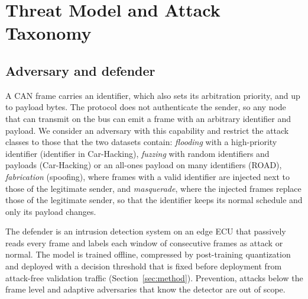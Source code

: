 \section{Threat Model and Attack Taxonomy}\label{sec:threat}

\subsection{Adversary and defender}
A CAN frame carries an identifier, which also sets its arbitration priority, and up to \NPayloadBytes{} payload
bytes. The protocol does not authenticate the sender, so any node that can transmit on the bus can emit a frame
with an arbitrary identifier and payload.
We consider an adversary with this capability and restrict the attack classes to those that the two datasets
contain: \emph{flooding} with a high-priority identifier (identifier \DoSTarget{} in Car-Hacking), \emph{fuzzing}
with random identifiers and payloads (Car-Hacking) or an all-ones payload on many identifiers (ROAD),
\emph{fabrication} (spoofing), where frames with a valid identifier are injected next to those of the legitimate
sender, and \emph{masquerade}, where the injected frames replace those of the legitimate sender, so that the
identifier keeps its normal schedule and only its payload changes.

The defender is an intrusion detection system on an edge ECU that passively reads every frame and labels each window
of \WinSize{} consecutive frames as attack or normal. The model is trained offline, compressed by post-training
quantization and deployed with a decision threshold that is fixed before deployment from attack-free validation
traffic (Section~\ref{sec:method}). Prevention, attacks below the frame level and adaptive adversaries that know
the detector are out of scope.

